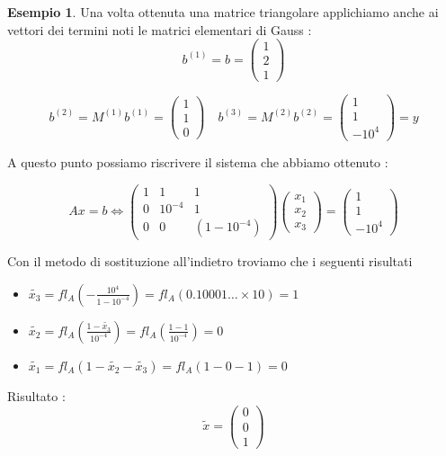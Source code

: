 \documentclass[12pt, a4paper]{book}
\theoremstyle{definition}
\newtheorem{exmp}{Esempio}[section]
\begin{document}
\begin{flushleft}
\begin{exmp}
Una volta ottenuta una matrice triangolare applichiamo anche ai vettori dei termini noti le matrici elementari di Gauss : 
\[ 	
	b^{(1)}  = b = 
	\begin{pmatrix}
		 1 \\
		 2 \\
		 1
	\end{pmatrix}
\]

\[ 	
	b^{(2)}  = M^{(1)}b^{(1)} = 
	\begin{pmatrix}
		 1 \\
		 1 \\
		 0
	\end{pmatrix}
	\quad
	b^{(3)}  = M^{(2)}b^{(2)} = 
	\begin{pmatrix}
		 1 \\
		 1 \\
		 -10^{4}
	\end{pmatrix}
	= y
\]

A questo punto possiamo riscrivere il sistema che abbiamo ottenuto :

\[ 
	Ax = b  \Longleftrightarrow 
	\begin{pmatrix}
		 1 & 1 & 1 \\
		 0 & 10^{-4} & 1 \\
		 0 & 0 & (1 - 10^{-4})
	\end{pmatrix}
	\begin{pmatrix}
		x_{1} \\
		x_{2} \\
		x_{3}
	\end{pmatrix}
	= 
	\begin{pmatrix}
		 1 \\
		 1 \\
		 -10^{4}
	\end{pmatrix}
\]

Con il metodo di sostituzione all'indietro troviamo che i seguenti risultati 
\begin{itemize}
	\item $\tilde{x_{3}} = fl_{A} \left( -\frac{10^{4}}{1 - 10^{-4}}\right) =  fl_{A}(0.10001 \dots \times 10 ) = 1$
	\item $\tilde{x_{2}} = fl_{A} \left( \frac{1 - \tilde{x_{3}}}{10^{-4}} \right) =  fl_{A}(\frac{1 - 1}{10^{-4}}) = 0$
	\item $\tilde{x_{1}} = fl_{A} \left( 1 - \tilde{x_{2}} - \tilde{x_{3}} \right) =  fl_{A}( 1 - 0 - 1) = 0$ 
\end{itemize}

Risultato : 
\[ 	
	\tilde{x} = 
	\begin{pmatrix}
		 0 \\
		 0 \\
		 1
	\end{pmatrix}
\]
\end{exmp}


\end{flushleft}
\end{document}
